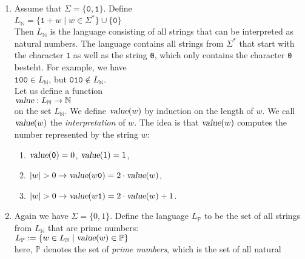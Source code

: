 \examplesEng
\begin{enumerate}
\item Assume that $\Sigma = \{\mathtt{0},\mathtt{1}\}$.  Define
      \\[0.2cm]
      \hspace*{1.3cm}
      $L_\mathbb{N} = \{ \mathtt{1}+w \mid w \in \Sigma^* \} \cup \{ \mathtt{0} \}$
      \\[0.2cm]
      Then $L_\mathbb{N}$ is the language consisting of all strings that can be interpreted as
      natural numbers.  The language contains all strings from $\Sigma^*$  that start with 
      the character \texttt{1} as well as the string \texttt{0}, which only contains the character
      \texttt{0} besteht.  For example, we have
      \\[0.2cm]
      \hspace*{1.3cm}
      $\mathtt{100} \in L_\mathbb{N}$, \quad but \quad $\mathtt{010} \not\in L_\mathbb{N}$.
      \\[0.2cm]
      Let us define a function 
      \\[0.2cm]
      \hspace*{1.3cm}
      $\textsl{value}: L_\mathbb{N} \rightarrow \mathbb{N}$
      \\[0.2cm]
      on the set $L_\mathbb{N}$.  We define $\textsl{value}(w)$ by induction on the length of $w$.
      We call $\textsl{value}(w)$ the \emph{interpretation} of $w$.  The idea is that
      $\textsl{value}(w)$ computes the number represented by the string $w$:
      \begin{enumerate}
      \item $\textsl{value}(\mathtt{0}) = 0$, $\textsl{value}(1) = 1$,
      \item $|w| > 0 \rightarrow \textsl{value}(w\mathtt{0}) = 2 \cdot \textsl{value}(w)   $,
      \item $|w| > 0 \rightarrow \textsl{value}(w\mathtt{1}) = 2 \cdot \textsl{value}(w) + 1$.
      \end{enumerate}
\item Again we have $\Sigma = \{0,1\}$. Define the language $L_\mathbb{P}$
      to be the set of all strings from $L_\mathbb{N}$ that are prime numbers:
      \\[0.2cm]
      \hspace*{1.3cm}
      $L_\mathbb{P} := \{ w \in L_\mathbb{N} \mid \textsl{value}(w) \in \mathbb{P} \}$
      \\[0.2cm]
      here, $\mathbb{P}$ denotes the set of \emph{prime numbers}, which is the set of all natural

\end{enumerate}
